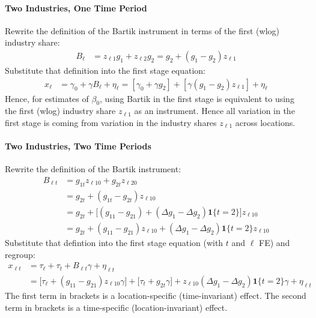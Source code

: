 \documentclass[12pt]{article}
\theoremstyle{plain}
\theoremstyle{definition}
\theoremstyle{remark}
\begin{document}
\paragraph{Two Industries, One Time Period}
Rewrite the definition of the Bartik instrument in terms of the first
(wlog) industry share:
\begin{align*}
  B_{\ell}
  &=
  z_{\ell 1}g_1 + z_{\ell 2} g_2
  =
  g_2 + (g_1-g_2)z_{\ell 1}
\end{align*}
Substitute that definition into the first stage equation:
\begin{align*}
  x_\ell
  &=
  \gamma_0
  +
  \gamma B_\ell
  +
  \eta_\ell
  =
  [\gamma_0 + \gamma g_2]
  +
  [\gamma(g_1-g_2) z_{\ell 1}]
  +
  \eta_\ell
\end{align*}
Hence, for estimates of $\beta_0$, using Bartik in the first stage is
equivalent to using the first (wlog) industry share $z_{\ell 1}$ as an
instrument.
Hence all variation in the first stage is coming from variation in the
industry shares $z_{\ell 1}$ across locations.

\paragraph{Two Industries, Two Time Periods}
Rewrite the definition of the Bartik instrument:
\begin{align*}
  B_{\ell t}
  &=
  g_{1 t}
  z_{\ell 10}
  +
  g_{2 t}
  z_{\ell 20}
  \\
  &=
  g_{2 t}
  +
  (g_{1 t} -g_{2 t})
  z_{\ell 10}
  \\
  &=
  g_{2 t}
  +
  \big[
    (g_{11}-g_{21})
    +
    (\Delta g_1 - \Delta g_2)
    \mathbf{1}\{t=2\}
  \big]
  z_{\ell 10}
  \\
  &=
  g_{2 t}
  +
  (g_{11}-g_{21})
  z_{\ell 10}
  +
  (\Delta g_1 - \Delta g_2)
  \mathbf{1}\{t=2\}
  z_{\ell 10}
\end{align*}
Substitute that defintion into the first stage equation (with $t$ and
$\ell$ FE) and regroup:
\begin{align*}
  x_{\ell t}
  &=
  \tau_{\ell}
  +
  \tau_t
  +
  B_{\ell t}\gamma
  + \eta_{\ell t}
  \\
  &=
  \big[
  \tau_{\ell}
  +
  (g_{11}-g_{21})
  z_{\ell 10}
  \gamma
  \big]
  +
  \big[
  \tau_t
  +
  g_{2t}\gamma
  \big]
  +
  z_{\ell 10}
  (\Delta g_1 - \Delta g_2)
  \mathbf{1}\{t=2\}
  \gamma
  + \eta_{\ell t}
\end{align*}
The first term in brackets is a location-specific (time-invariant) effect.
The second term in brackets is a time-specific (location-invariant)
effect.
\end{document}

